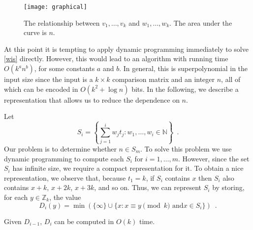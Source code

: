 \documentclass[11pt]{patmorin}
\newcommand{\Z}{\mathbb{Z}}
\begin{document}
\begin{figure}
\begin{center}\texttt{[image: graphical]}\end{center}
\caption{The relationship between $v_1,\ldots,v_k$ and
$w_1,\ldots,w_k$. The area under the
curve is $n$.} 
\end{figure}

At this point it is tempting to apply dynamic programming immediately
to solve \eqref{wis} directly.  However, this would lead to an
algorithm with running time $O(k^a n^b)$, for some constants $a$ and
$b$.  In general, this is superpolynomial in the input size since the
input is a $k\times k$ comparison matrix and an integer $n$, all of
which can be encoded in $O(k^2 + \log n)$ bits.  In the following, we
describe a representation that allows us to reduce the dependence
on $n$.

Let 
\[ S_i = \left\{\sum_{j=1}^i w_jt_j : 
        w_1,\ldots,w_i\in \mathbb{N} \right\} 
\enspace .
\]
Our problem is to determine whether $n\in S_m$.
To solve this problem we use dynamic programming to compute each $S_i$ for
$i=1,\ldots,m$.  However, since the set $S_i$ has infinite size, we
require a compact representation for it.  To obtain a nice
representation, we observe that, because $t_1=k$, if $S_i$ contains
$x$ then $S_i$ also contains $x+k$, $x+2k$, $x+3k$, and so on.  Thus,
we can represent $S_i$ by storing, for each $y\in \Z_k$,
the value 
\[
   D_{i}(y) = \min (\{\infty\}\cup\{x: \mbox{$x\equiv y\pmod k$ and
$x\in S_i$} \}) \enspace . 
\]
\begin{lem}
Given $D_{i-1}$, $D_i$ can be computed in $O(k)$ time.
\end{lem}
\end{document}

